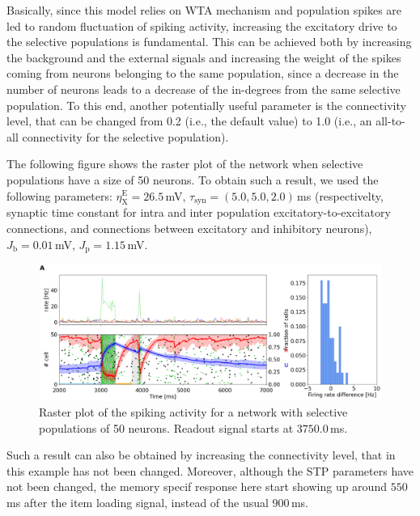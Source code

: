 \documentclass[a4paper, 12pt, twoside, openright]{book}
\newcommand{\exc}{\text{E}}     %
\newcommand{\ext}{\text{X}}   %
\begin{document}
Basically, since this model relies on WTA mechanism and population spikes are led to random fluctuation of spiking activity, increasing the excitatory drive to the selective populations is fundamental. This can be achieved both by increasing the background and the external signals and increasing the weight of the spikes coming from neurons belonging to the same population, since a decrease in the number of neurons leads to a decrease of the in-degrees from the same selective population. To this end, another potentially useful parameter is the connectivity level, that can be changed from 0.2 (i.e., the default value) to 1.0 (i.e., an all-to-all connectivity for the selective population).


The following figure shows the raster plot of the network when selective populations have a size of 50 neurons. To obtain such a result, we used the following parameters: $\eta_{\ext}^{\exc}=26.5$\,mV, $\tau_{\text{syn}}=(5.0, 5.0, 2.0)$\,ms (respectivelty, synaptic time constant for intra and inter population excitatory-to-excitatory connections, and connections between excitatory and inhibitory neurons), $J_{\text{b}}=0.01$\,mV, $J_{\text{p}}=1.15$\,mV.

\begin{figure}[H]
    \centering
    \includegraphics[width=\columnwidth]{figures/50neurons.png}
    \caption{Raster plot of the spiking activity for a network with selective populations of 50 neurons. Readout signal starts at $3750.0$\,ms.}
    \label{fig:50neurons}
\end{figure}

Such a result can also be obtained by increasing the connectivity level, that in this example has not been changed. Moreover, although the STP parameters have not been changed, the memory specif response here start showing up around $550$\,ms after the item loading signal, instead of the usual $900$\,ms.
\end{document}
